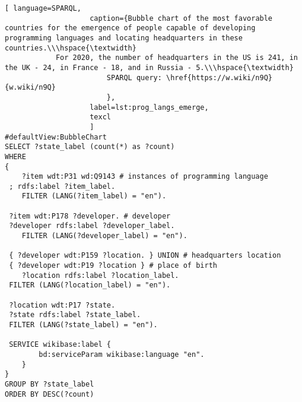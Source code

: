 \begin{lstlisting}[ language=SPARQL, 
                    caption={Bubble chart of the most favorable countries for the emergence of people capable of developing programming languages and locating headquarters in these countries.\\\hspace{\textwidth}
			For 2020, the number of headquarters in the US is 241, in the UK - 24, in France - 18, and in Russia - 5.\\\hspace{\textwidth}
                        SPARQL query: \href{https://w.wiki/n9Q}{w.wiki/n9Q}
                        },
                    label=lst:prog_langs_emerge,
                    texcl 
                    ]
#defaultView:BubbleChart
SELECT ?state_label (count(*) as ?count)
WHERE
{
 	?item wdt:P31 wd:Q9143 # instances of programming language
 ; rdfs:label ?item_label. 
 	FILTER (LANG(?item_label) = "en"). 
 
 ?item wdt:P178 ?developer. # developer
 ?developer rdfs:label ?developer_label. 
 	FILTER (LANG(?developer_label) = "en"). 
 		
 { ?developer wdt:P159 ?location. } UNION # headquarters location
 { ?developer wdt:P19 ?location } # place of birth
 	?location rdfs:label ?location_label. 
 FILTER (LANG(?location_label) = "en").
 
 ?location wdt:P17 ?state.
 ?state rdfs:label ?state_label. 
 FILTER (LANG(?state_label) = "en").

 SERVICE wikibase:label {
		bd:serviceParam wikibase:language "en".
	} 	
}
GROUP BY ?state_label
ORDER BY DESC(?count)
\end{lstlisting}%


